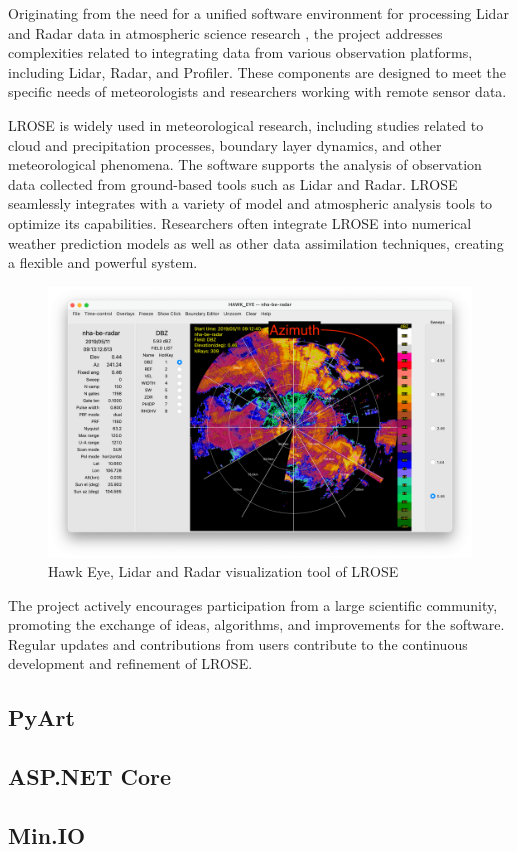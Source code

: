 Originating from the need for a unified software environment for processing
Lidar and Radar data in atmospheric science research \cite{lrose}, the project
addresses complexities related to integrating data from various observation
platforms, including Lidar, Radar, and Profiler. These components are designed
to meet the specific needs of meteorologists and researchers working with remote
sensor data.

LROSE is widely used in meteorological research, including studies related to
cloud and precipitation processes, boundary layer dynamics, and other
meteorological phenomena. The software supports the analysis of observation data
collected from ground-based tools such as Lidar and Radar. LROSE seamlessly
integrates with a variety of model and atmospheric analysis tools to optimize
its capabilities. Researchers often integrate LROSE into numerical weather
prediction models as well as other data assimilation techniques, creating a
flexible and powerful system.

\begin{figure}[H]
    \centering
    \includegraphics[width=0.8\linewidth]{Images/3.5-hawk-eye.png}
    \caption{Hawk Eye, Lidar and Radar visualization tool of LROSE}
    \label{fig:hawk-eye}
\end{figure}

The project actively encourages participation from a large scientific community,
promoting the exchange of ideas, algorithms, and improvements for the software.
Regular updates and contributions from users contribute to the continuous
development and refinement of LROSE.

\subsection{PyArt}

\subsection{ASP.NET Core}

\subsection{Min.IO}